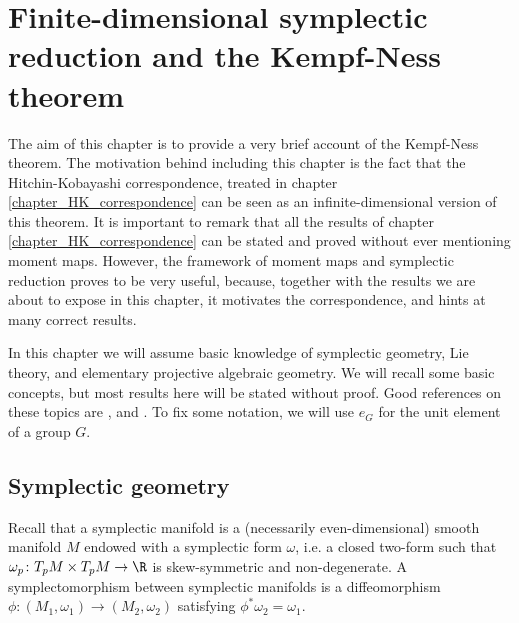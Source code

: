 \chapter{Finite-dimensional symplectic reduction and the Kempf-Ness theorem} \label{chapter_kempf_Ness}
The aim of this chapter is to provide a very brief account of the Kempf-Ness theorem. The motivation behind including this chapter is the fact that the Hitchin-Kobayashi correspondence, treated in chapter \ref{chapter_HK_correspondence} can be seen as an infinite-dimensional version of this theorem. It is important to remark that all the results of chapter \ref{chapter_HK_correspondence} can be stated and proved without ever mentioning moment maps. However, the framework of moment maps and symplectic reduction proves to be very useful, because, together with the results we are about to expose in this chapter, it motivates the correspondence, and hints at many correct results. 

In this chapter we will assume basic knowledge of symplectic geometry, Lie theory, and elementary projective algebraic geometry. We will recall some basic concepts, but most results here will be stated without proof. Good references on these topics are \parencite{da2001lectures}, \parencite{hoskins} and \parencite{hilgert2011structure}. To fix some notation, we will use \(e_G\) for the unit element of a group \(G\).


\section{Symplectic geometry}

Recall that a symplectic manifold is a (necessarily even-dimensional) smooth manifold \(M\) endowed with a symplectic form \(\omega\), i.e. a closed two-form such that \(\omega_p\colon T_pM \times T_pM \to \R\) is skew-symmetric and non-degenerate. A symplectomorphism between symplectic manifolds is a diffeomorphism \(\phi\colon (M_1, \omega_1) \to (M_2, \omega_2)\) satisfying \(\phi^*\omega_2=\omega_1\).

